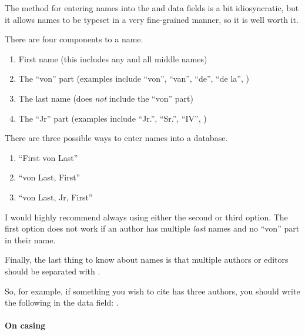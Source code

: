 The method for entering names into the  and  data fields is a bit idiosyncratic, but it allows names to be typeset in a very fine-grained manner, so it is well worth it.

There are four components to a name.

\begin{enumerate}[label={(\roman*)}]

	\item{First name (this includes any and all middle names)}
	
	\item{The ``von'' part (examples include ``von'', ``van'', ``de'', ``de la'', \ETC)}
	
	\item{The last name (does \emph{not} include the ``von'' part)}
	
	\item{The ``Jr'' part (examples include ``Jr.'', ``Sr.'', ``IV'', \ETC)}

\end{enumerate}

There are three possible ways to enter names into a  database.

\begin{enumerate}[label={(\roman*)}]

	\item{``First von Last''}
	
	\item{``von Last, First''}
	
	\item{``von Last, Jr, First''}

\end{enumerate}

I would highly recommend always using either the second or third option.
The first option does not work if an author has multiple \emph{last} names and no ``von'' part in their name.

Finally, the last thing to know about names is that multiple authors or editors should be separated with .

So, for example, if something you wish to cite has three authors, you should write the following in the  data field: .

\paragraph{On casing}

